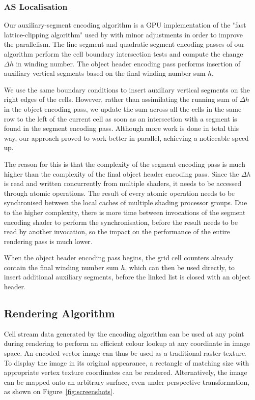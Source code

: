 \documentclass[11pt,a4paper,twoside]{article}
\begin{document}
\subsubsection{AS Localisation}

Our auxiliary-segment encoding algorithm is a GPU implementation of the "fast lattice-clipping algorithm" used by \cite{NehabHoppe08} with minor adjustments in order to improve the parallelism. The line segment and quadratic segment encoding passes of our algorithm perform the cell boundary intersection tests and compute the change  $\Delta{h}$ in winding number. The object header encoding pass performs insertion of auxiliary vertical segments based on the final winding number sum $h$.

We use the same boundary conditions to insert auxiliary vertical segments on the right edges of the cells. However, rather than assimilating the running sum of $\Delta{h}$ in the object encoding pass, we update the sum across all the cells in the same row to the left of the current cell as soon as an intersection with a segment is found in the segment encoding pass. Although more work is done in total this way, our approach proved to work better in parallel, achieving a noticeable speed-up.

The reason for this is that the complexity of the segment encoding pass is much higher than the complexity of the final object header encoding pass. Since the $\Delta{h}$ is read and written concurrently from multiple shaders, it needs to be accessed through atomic operations. The result of every atomic operation needs to be synchronised between the local caches of multiple shading processor groups. Due to the higher complexity, there is more time between invocations of the segment encoding shader to perform the synchronisation, before the result needs to be read by another invocation, so the impact on the performance of the entire rendering pass is much lower.

When the object header encoding pass begins, the grid cell counters already contain the final winding number sum $h$, which can then be used directly, to insert additional auxiliary segments, before the linked list is closed with an object header.

\subsection {Rendering Algorithm}

Cell stream data generated by the encoding algorithm can be used at any point during rendering to perform an efficient colour lookup at any coordinate in image space. An encoded vector image can thus be used as a traditional raster texture. To display the image in its original appearance, a rectangle of matching size with appropriate vertex texture coordinates can be rendered. Alternatively, the image can be mapped onto an arbitrary surface, even under perspective transformation, as shown on Figure~\ref{fig:screenshots}.
\end{document}
